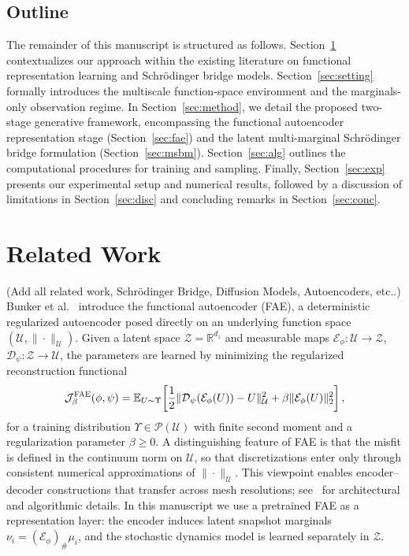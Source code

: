 \documentclass[review,onefignum,onetabnum]{siamart250211}
\newcommand{\E}{\mathbb{E}}
\newcommand{\R}{\mathbb{R}}
\newcommand{\1}{\mathbf{1}}
\newcommand{\cU}{\mathcal{U}}
\newcommand{\cZ}{\mathcal{Z}}
\newcommand{\cP}{\mathcal{P}}
\newcommand{\cJ}{\mathcal{J}}
\newcommand{\cE}{\mathcal{E}}
\newcommand{\cD}{\mathcal{D}}
\begin{document}
\subsection{Outline}
The remainder of this manuscript is structured as follows. Section~\ref{sec:related} contextualizes our approach within the existing literature on functional representation learning and Schr\"odinger bridge models. Section~\ref{sec:setting} formally introduces the multiscale function-space environment and the marginals-only observation regime. In Section~\ref{sec:method}, we detail the proposed two-stage generative framework, encompassing the functional autoencoder representation stage (Section~\ref{sec:fae}) and the latent multi-marginal Schr\"odinger bridge formulation (Section~\ref{sec:msbm}). Section~\ref{sec:alg} outlines the computational procedures for training and sampling. Finally, Section~\ref{sec:exp} presents our experimental setup and numerical results, followed by a discussion of limitations in Section~\ref{sec:disc} and concluding remarks in Section~\ref{sec:conc}.


\section{Related Work}\label{sec:related}
(Add all related work, Schrödinger Bridge, Diffusion Models, Autoencoders, etc..)
Bunker et al.~\cite{bunker2025fae} introduce the functional autoencoder (\textsc{FAE}), a deterministic regularized autoencoder posed directly on an underlying function space $(\cU,\|\cdot\|_{\cU})$. Given a latent space $\cZ=\R^{d_z}$ and measurable maps $\cE_\phi:\cU\to\cZ$, $\cD_\psi:\cZ\to\cU$, the parameters are learned by minimizing the regularized reconstruction functional
\begin{equation}
\cJ_{\beta}^{\mathrm{\textsc{FAE}}}(\phi,\psi)
= \E_{U\sim\Upsilon}\!\left[
\frac12\|\cD_\psi(\cE_\phi(U)) - U\|_{\cU}^2
+ \beta\|\cE_\phi(U)\|_2^2
\right],
\label{eq:fae_rec_loss_related}
\end{equation}
for a training distribution $\Upsilon\in\cP(\cU)$ with finite second moment and a regularization parameter $\beta\ge 0$. A distinguishing feature of \textsc{FAE} is that the misfit is defined in the continuum norm on $\cU$, so that discretizations enter only through consistent numerical approximations of $\|\cdot\|_{\cU}$. This viewpoint enables encoder--decoder constructions that transfer across mesh resolutions; see~\cite{bunker2025fae} for architectural and algorithmic details. In this manuscript we use a pretrained \textsc{FAE} as a representation layer: the encoder induces latent snapshot marginals $\nu_i=(\cE_\phi)_\#\mu_i$, and the stochastic dynamics model is learned separately in $\cZ$.
\end{document}

